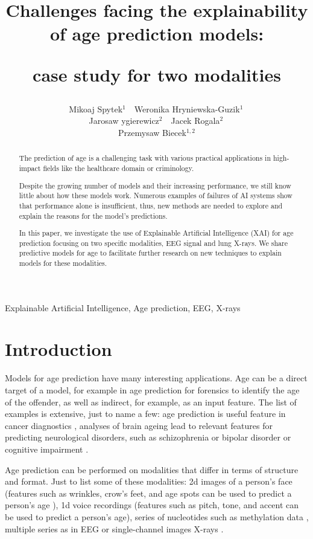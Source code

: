 \documentclass[letterpaper]{article} %
\title{Challenges facing the explainability of age prediction models:

case study for two modalities}
\author{
       Mikoaj Spytek${}^1$\,\,\,\, Weronika Hryniewska-Guzik${}^1$\, \\ Jarosaw ygierewicz${}^2$\,\,\,\, Jacek Rogala${}^2$\, \\  Przemysaw Biecek${}^{1,2}$
}
\begin{document}
\maketitle

\begin{abstract}
The prediction of age is a challenging task with various practical applications in high-impact fields like the healthcare domain or criminology.

Despite the growing number of models and their increasing performance, we still know little about how these models work.
Numerous examples of failures of AI systems show that performance alone is insufficient, thus, new methods are needed to explore and explain the reasons for the model's predictions.

In this paper, we investigate the use of Explainable Artificial Intelligence (XAI) for age prediction focusing on two specific modalities, EEG signal and lung X-rays. We share predictive models for age to facilitate further research on new techniques to explain models for these modalities.

\end{abstract}

\begin{keywords}
  Explainable Artificial Intelligence, Age prediction, EEG, X-rays
\end{keywords}

\section{Introduction}

Models for age prediction have many interesting applications. Age can be a direct target of a model, for example in age prediction for forensics to identify the age of the offender, as well as indirect, for example, as an input feature. The list of examples is extensive, just to name a few: age prediction is useful feature in cancer diagnostics \cite{cancer21}, analyses of brain ageing lead to relevant features for predicting neurological disorders, such as schizophrenia or bipolar disorder \cite{BrainAGE17} or cognitive impairment \cite{NeuroImage17}.

Age prediction can be performed on modalities that differ in terms of structure and format. Just to list some of these modalities: 2d images of a person's face (features such as wrinkles, crow's feet, and age spots can be used to predict a person's age \cite{CVPRWage15}), 1d voice recordings (features such as pitch, tone, and accent can be used to predict a person's age), series of nucleotides such as methylation data \cite{methylclock20}, multiple series as in EEG \cite{EEGage19, ColeBrain17} or single-channel images X-rays \cite{Thodberg2017}.
\end{document}
